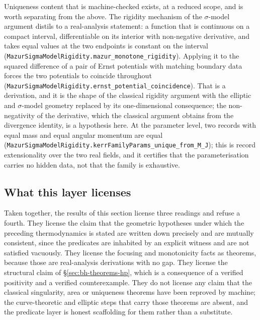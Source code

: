 \documentclass[aps,prd,nofootinbib,superscriptaddress,12pt]{revtex4-2}
\DeclareRobustCommand{\lb}{\discretionary{}{}{}}
\begin{document}
Uniqueness content that is machine-checked exists, at a reduced scope, and is
worth separating from the above. The rigidity mechanism of the $\sigma$-model
argument distils to a real-analysis statement: a function that is continuous on a
compact interval, differentiable on its interior with non-negative derivative,
and takes equal values at the two endpoints is constant on the interval
(\texttt{Mazur\lb{}Sigma\lb{}Model\lb{}Rigidity.\lb{}mazur\_\lb{}monotone\_\lb{}rigidity}). Applying it to the
squared difference of a pair of Ernst potentials with matching boundary data
forces the two potentials to coincide throughout
(\texttt{Mazur\lb{}Sigma\lb{}Model\lb{}Rigidity.\lb{}ernst\_\lb{}potential\_\lb{}coincidence}). That is a
derivation, and it is the shape of the classical rigidity argument with the
elliptic and $\sigma$-model geometry replaced by its one-dimensional consequence;
the non-negativity of the derivative, which the classical argument obtains from
the divergence identity, is a hypothesis here. At the parameter level, two
records with equal mass and equal angular momentum are equal
(\texttt{Mazur\lb{}Sigma\lb{}Model\lb{}Rigidity.\lb{}kerr\lb{}Family\lb{}Params\_\lb{}unique\_\lb{}from\_\lb{}M\_\lb{}J}); this is
record extensionality over the two real fields, and it certifies that the
parameterisation carries no hidden data, not that the family is exhaustive.

\subsection{What this layer licenses}

Taken together, the results of this section license three readings and refuse a
fourth. They license the claim that the geometric hypotheses under which the
preceding thermodynamics is stated are written down precisely and are mutually
consistent, since the predicates are inhabited by an explicit witness and are not
satisfied vacuously. They license the focusing and monotonicity facts as
theorems, because those are real-analysis derivations with no gap. They license
the structural claim of \S\ref{sec:bh-theorems-hp}, which is a consequence of a
verified positivity and a verified counterexample. They do not license any claim
that the classical singularity, area or uniqueness theorems have been reproved by
machine; the curve-theoretic and elliptic steps that carry those theorems are
absent, and the predicate layer is honest scaffolding for them rather than a
substitute.

\end{document}
